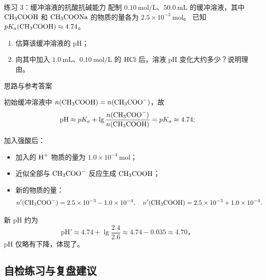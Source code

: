 \documentclass[a4paper,11pt]{ctexart}
\begin{document}
\begin{examplebox}{练习 3：缓冲溶液的抗酸抗碱能力}
  配制 $0.10\ \mathrm{mol/L}$、$50.0\ \mathrm{mL}$ 的缓冲溶液，其中 $\ce{CH3COOH}$ 和 $\ce{CH3COONa}$ 的物质的量各为 $2.5\times 10^{-3}\ \mathrm{mol}$。
  已知 $pK_a(\ce{CH3COOH}) \approx 4.74$。
  \begin{enumerate}
    \item 估算该缓冲溶液的 pH；
    \item 向其中加入 $1.0\ \mathrm{mL}$、$0.10\ \mathrm{mol/L}$ 的 $\ce{HCl}$ 后，溶液 pH 变化大约多少？说明理由。
  \end{enumerate}

  \begin{proofbox}{思路与参考答案}
    \begin{focuspoints}
      \item 初始缓冲溶液中 $n(\ce{CH3COOH}) = n(\ce{CH3COO^-})$，故
        \[
          \mathrm{pH} \approx pK_a + \lg\dfrac{n(\ce{CH3COO^-})}{n(\ce{CH3COOH})}
          = pK_a \approx 4.74;
        \]
      \item 加入强酸后：
        \begin{itemize}
          \item 加入的 $\ce{H^+}$ 物质的量为 $1.0\times 10^{-4}\ \mathrm{mol}$；
          \item 近似全部与 $\ce{CH3COO^-}$ 反应生成 $\ce{CH3COOH}$；
          \item 新的物质的量：
          \[
            n'(\ce{CH3COO^-}) = 2.5\times 10^{-3} - 1.0\times 10^{-4},\quad
            n'(\ce{CH3COOH}) = 2.5\times 10^{-3} + 1.0\times 10^{-4}.
          \]
        \end{itemize}
      \item 新 pH 约为
        \[
          \mathrm{pH}' \approx 4.74 + \lg\dfrac{2.4}{2.6} \approx 4.74 - 0.035 \approx 4.70，
        \]
        pH 仅略有下降，体现了。
    \end{focuspoints}
  \end{proofbox}
\end{examplebox}

\subsection{自检练习与复盘建议}
\end{document}
